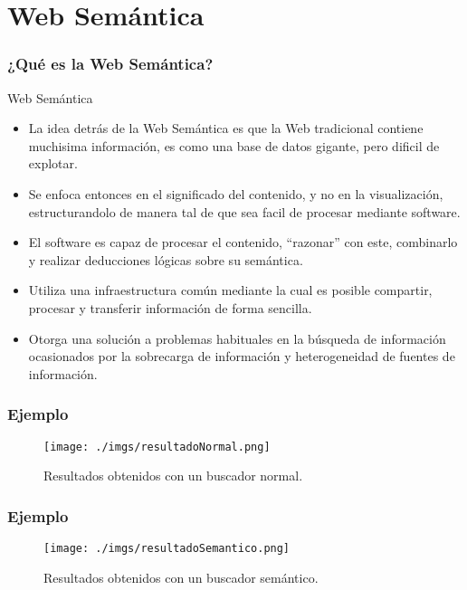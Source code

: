 \documentclass{beamer}
\begin{document}
\section{Web Semántica} 
\begin{frame}
\frametitle{¿Qué es la Web Semántica?} 
\begin{block}{Web Semántica}
\begin{itemize}
\item<1-> La idea detrás de la Web Semántica es que la Web tradicional contiene muchisima información, es como una base de datos gigante, pero dificil de explotar.
\item<1-> Se enfoca entonces en el significado del contenido, y no en la visualización, estructurandolo de manera tal de que sea facil de procesar mediante software.
\item<2-> El software es capaz de procesar el contenido, ``razonar'' con este, combinarlo y realizar deducciones lógicas sobre su semántica.
\item<3-> Utiliza una infraestructura común mediante la cual es posible compartir, procesar y transferir información de forma sencilla.
\item<4-> Otorga una solución a problemas habituales en la búsqueda de información ocasionados por la sobrecarga de información y heterogeneidad de fuentes de información.
\end{itemize}
\end{block}
\end{frame}
\begin{frame}
\frametitle{Ejemplo} 
\begin{figure}[H] %
\begin{center}
\texttt{[image: ./imgs/resultadoNormal.png]}
\caption{Resultados obtenidos con un buscador normal.}
\end{center}
\end{figure}
\end{frame}
\begin{frame}
\frametitle{Ejemplo} 
\begin{figure}[H] %
\begin{center}
\texttt{[image: ./imgs/resultadoSemantico.png]}
\caption{Resultados obtenidos con un buscador semántico.}
\end{center}
\end{figure}
\end{frame}
\end{document}
